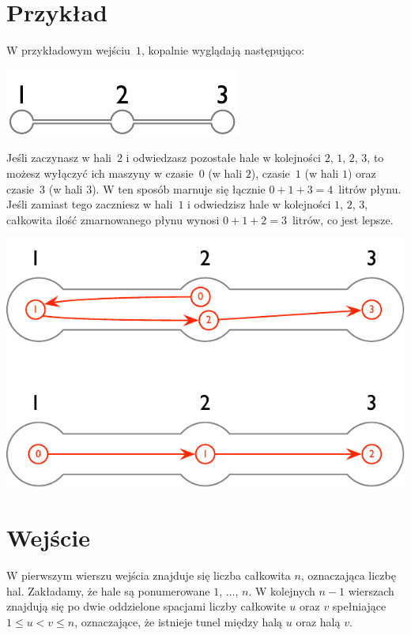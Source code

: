 \section*{Przykład}

W przykładowym wejściu~$1$, kopalnie wyglądają następująco:

\includegraphics[width=.2\textwidth]{img/sample-1.pdf}

Jeśli zaczynasz w hali~$2$ i odwiedzasz pozostałe hale w kolejności $2$, $1$, $2$, $3$, to możesz wyłączyć ich maszyny w czasie~$0$ (w hali $2$), czasie~$1$ (w hali $1$) oraz czasie~$3$ (w hali $3$).
W ten sposób marnuje się łącznie $0+1+3=4$~litrów płynu.
Jeśli zamiast tego zaczniesz w hali~$1$ i odwiedzisz hale w kolejności $1$, $2$, $3$, całkowita ilość zmarnowanego płynu wynosi $0+1+2=3$~litrów, co jest lepsze.

\includegraphics[width=.4\textwidth]{img/sample-1-ans.pdf}

\section*{Wejście}

W pierwszym wierszu wejścia znajduje się liczba całkowita $n$, oznaczająca liczbę hal.
Zakładamy, że hale są ponumerowane $1$, $\ldots$, $n$.
W kolejnych $n-1$ wierszach znajdują się po dwie oddzielone spacjami liczby całkowite $u$ oraz $v$ spełniające
$1\leq u < v \leq n$, %
oznaczające, że istnieje tunel między halą $u$ oraz halą $v$.

